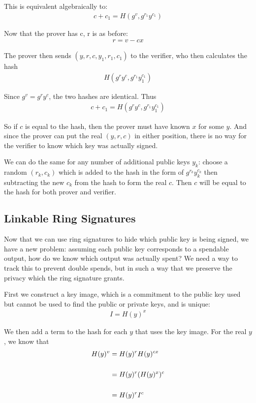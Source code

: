 \documentclass{article}
\begin{document}
This is equivalent algebraically to:
\begin{align}
  c + c_1 = H(g^v, g^{r_1} y^{c_1})
\end{align}

Now that the prover has c, r is as before:
\begin{align}
  r = v - cx
\end{align}

The prover then sends $(y, r, c, y_1, r_1, c_1)$ to the verifier, who then calculates the hash
\begin{align}
  H(g^r y^c, g^{r_1} y_1^{c_1})
\end{align}

Since $g^v = g^r y^c$, the two hashes are identical.  Thus 
\begin{align}
  c + c_1 = H(g^r y^c, g^{r_1} y_1^{c_1})
\end{align}

So if $c$ is equal to the hash, then the prover must have known $x$ for some $y$.  And since the prover can put the real $(y,r,c)$ in either position, there is no way for the verifier to know which key was actually signed.

We can do the same for any number of additional public keys $y_k$: choose a random $(r_k,c_k)$ which is added to the hash in the form of $g^{r_k}y_k^{c_k}$ then subtracting the new $c_k$ from the hash to form the real $c$. Then $c$ will be equal to the hash for both prover and verifier.



\subsection{Linkable Ring Signatures}

Now that we can use ring signatures to hide which public key is being signed, we have a new problem: assuming each public key corresponds to a spendable output, how do we know which output was actually spent?  We need a way to track this to prevent double spends, but in such a way that we preserve the privacy which the ring signature grants.

First we construct a key image, which is a commitment to the public key used but cannot be used to find the public or private keys, and is unique:
\begin{align}
  I = H(y)^x
\end{align}

We then add a term to the hash for each $y$ that uses the key image.  For the real $y$, we know that
\begin{align}
  H(y)^v &= H(y)^r H(y)^{cx}\\
  \cr &= H(y)^r (H(y)^x)^c\\
  \cr &= H(y)^r I^c
\end{align}
\end{document}
